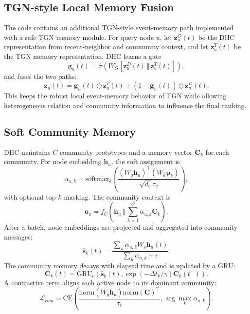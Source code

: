 \documentclass[runningheads]{llncs}
\begin{document}
\subsection{TGN-style Local Memory Fusion}
The code contains an additional TGN-style event-memory path implemented with a safe TGN memory module. For query node $u$, let $\mathbf{z}^{D}_u(t)$ be the DHC representation from recent-neighbor and community context, and let $\mathbf{z}^{T}_u(t)$ be the TGN memory representation. DHC learns a gate
\begin{equation}
\mathbf{g}_u(t)=\sigma\left(W_G[\mathbf{z}^{D}_u(t)\,\Vert\,\mathbf{z}^{T}_u(t)]\right),
\end{equation}
and fuses the two paths:
\begin{equation}
\mathbf{z}_u(t)=\mathbf{g}_u(t)\odot\mathbf{z}^{T}_u(t)+(1-\mathbf{g}_u(t))\odot\mathbf{z}^{D}_u(t).
\end{equation}
This keeps the robust local event-memory behavior of TGN while allowing heterogeneous relation and community information to influence the final ranking.

\subsection{Soft Community Memory}
DHC maintains $C$ community prototypes and a memory vector $\mathbf{C}_k$ for each community. For node embedding $\mathbf{h}_u$, the soft assignment is
\begin{equation}
\alpha_{u,k}=\mathrm{softmax}_k\left(\frac{(W_q\mathbf{h}_u)^\top(W_k\mathbf{p}_k)}{\sqrt{d_c}\tau_a}\right),
\end{equation}
with optional top-$k$ masking. The community context is
\begin{equation}
\mathbf{o}_u=f_C\left(\mathbf{h}_u\,\Vert\,\sum_{k=1}^{C}\alpha_{u,k}\mathbf{C}_k\right).
\end{equation}
After a batch, node embeddings are projected and aggregated into community messages:
\begin{equation}
\bar{\mathbf{s}}_k(t)=\frac{\sum_{u}\alpha_{u,k}W_s\mathbf{h}_u(t)}{\sum_u\alpha_{u,k}+\epsilon}.
\end{equation}
The community memory decays with elapsed time and is updated by a GRU:
\begin{equation}
\mathbf{C}_k(t)=\mathrm{GRU}_c\left(\bar{\mathbf{s}}_k(t), \exp(-\Delta t_k/\gamma)\mathbf{C}_k(t^-)\right).
\end{equation}
A contrastive term aligns each active node to its dominant community:
\begin{equation}
\mathcal{L}_{com}=\mathrm{CE}\left(\frac{\mathrm{norm}(W_q\mathbf{h}_u)\mathrm{norm}(\mathbf{C})^\top}{\tau_c}, \arg\max_k\alpha_{u,k}\right).
\end{equation}
\end{document}
